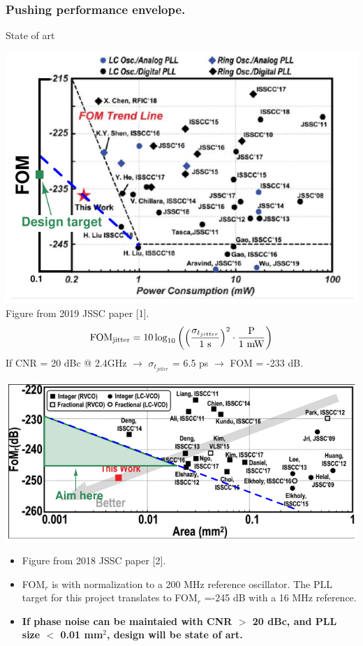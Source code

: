\documentclass[t, screen, aspectratio=43]{beamer}
\begin{document}
\begin{frame}
	\frametitle{Pushing performance envelope.}
	\begin{block}{State of art}
	\begin{minipage}{5.5cm}
	\tiny\vspace{0.5em}
		\hspace{1em}\includegraphics[width=1\textwidth, angle=0]{power_fom_state_art.pdf}
		\tiny
		Figure from 2019 JSSC paper [1].
		\tiny\vspace{-1em}
		\begin{equation}
			\textnormal{FOM}_{\textnormal{jitter}} = 10 \log_{10}\left(\left(\frac{\sigma_{t_{jitter}}}{\textrm{1 s}}\right)^2\cdot\frac{\textnormal{P}}{\textnormal{1 mW}}\right)
		\end{equation}
		{If CNR = 20 dBc @ 2.4GHz $\rightarrow$ $\sigma_{t_{jitter}}$ = 6.5 ps $\rightarrow$ FOM = -233 dB.}
	\end{minipage}
	\begin{minipage}{5.5cm}
		\hspace{1em}\includegraphics[width=1\textwidth, angle=0]{fom_area_state_art.pdf}
		\tiny
		\begin{itemize}[itemsep=4pt,label=\protect---]
			\item Figure from 2018 JSSC paper [2].
			\item FOM$_r$ is with normalization to a 200 MHz reference oscillator. The PLL target for this project translates to FOM$_r$ =-245 dB with a 16 MHz reference.
			\item \textbf{If phase noise can be maintaied with CNR $>$ 20 dBc, and PLL size $<$ 0.01 mm$^2$, design will be state of art.}
		\end{itemize} 	
	\end{minipage}


\end{block}
\end{frame}
\end{document}

